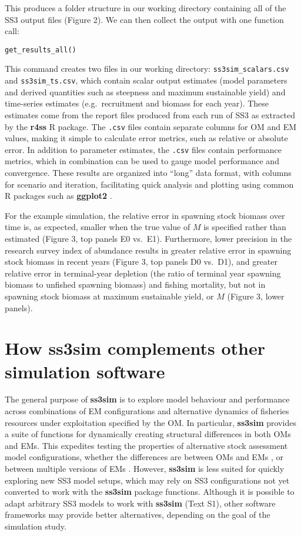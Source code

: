 \noindent
This produces a folder structure in our working directory containing all of the
SS3 output files (Figure 2). We can then collect the output with one
function call:

\begin{verbatim}
get_results_all()
\end{verbatim}

\noindent
This command creates two files in our working directory:
\texttt{ss3sim\_scalars.csv} and \texttt{ss3sim\_ts.csv}, which contain scalar
output estimates (model parameters and derived quantities such as
steepness and maximum sustainable yield) and time-series estimates
(e.g.~recruitment and biomass for each year). These estimates come from the
report files produced from each run of SS3 as extracted by the \textbf{r4ss}
\textsf{R} package. The \texttt{.csv} files contain separate columns for OM and
EM values, making it simple to calculate error metrics, such as relative or
absolute error. In addition to parameter estimates, the \texttt{.csv} files
contain performance metrics, which in combination can be used to gauge model
performance and convergence. These results are organized into ``long'' data
format, with columns for scenario and iteration, facilitating quick analysis
and plotting using common \textsf{R} packages such as \textbf{ggplot2}
\cite{wickham2009}.

For the example simulation, the relative error in spawning stock biomass over
time is, as expected, smaller when the true value of $M$ is specified rather
than estimated (Figure 3, top panels E0 vs.~E1). Furthermore, lower precision
in the research survey index of abundance results in greater relative error in
spawning stock biomass in recent years (Figure 3, top panels D0 vs.~D1), and
greater relative error in terminal-year depletion (the ratio of terminal year
spawning biomass to unfished spawning biomass) and fishing mortality, but not
in spawning stock biomass at maximum sustainable yield, or $M$ (Figure 3, lower
panels).

\section*{How ss3sim complements other simulation software}

The general purpose of \textbf{ss3sim} is to explore model behaviour and
performance across combinations of EM configurations and alternative dynamics
of fisheries resources under exploitation specified by the OM. In particular,
\textbf{ss3sim} provides a suite of functions for dynamically creating
structural differences in both OMs and EMs. This expedites testing the
properties of alternative stock assessment model configurations, whether the
differences are between OMs and EMs \cite{johnson2014}, or between multiple
versions of EMs \cite{ono2014}. However, \textbf{ss3sim} is less suited for
quickly exploring new SS3 model setups, which may rely on SS3 configurations
not yet converted to work with the \textbf{ss3sim} package functions.
Although it is possible to adapt arbitrary SS3 models to work with
\textbf{ss3sim} (Text S1), other software frameworks may provide better
alternatives, depending on the goal of the simulation study.


